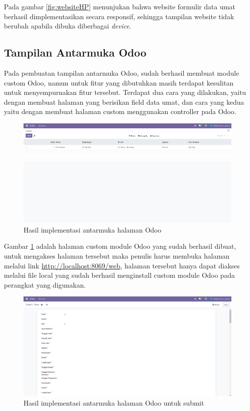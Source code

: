 Pada gambar \ref{fig:websiteHP} menunjukan bahwa website formulir data umat berhasil dimplementasikan secara responsif, sehingga tampilan website tidak berubah apabila dibuka diberbagai \textit{device}.

\subsection{Tampilan Antarmuka Odoo}
\label{sec:tampilanAntarmukaOdoo}

Pada pembuatan tampilan antarmuka Odoo, sudah berhasil membuat module custom Odoo, namun untuk fitur yang dibutuhkan masih terdapat kesulitan untuk menyempurnakan fitur tersebut. Terdapat dua cara yang dilakukan, yaitu dengan membuat halaman yang berisikan field data umat, dan cara yang kedua yaitu dengan membuat halaman custom menggunakan controller pada Odoo.

\begin{figure}[H]
	\centering
	\includegraphics[scale=0.4]{Gambar/odooBuatBaru.png}
	\caption{Hasil implementasi antarmuka halaman Odoo} 
	\label{fig:odooBuatBaru}
\end{figure}

Gambar \ref{fig:odooBuatBaru} adalah halaman custom module Odoo yang sudah berhasil dibuat, untuk mengakses halaman tersebut maka penulis harus membuka halaman melalui link \url{http://localhost:8069/web}, halaman tersebut hanya dapat diakses melalui file local yang sudah berhasil menginstall custom module Odoo pada perangkat yang digunakan.

\begin{figure}[H]
	\centering
	\includegraphics[scale=0.4]{Gambar/odooBuatBaru2.png}
	\caption{Hasil implementasi antarmuka halaman Odoo untuk submit} 
	\label{fig:odooBuatBaru2}
\end{figure}

